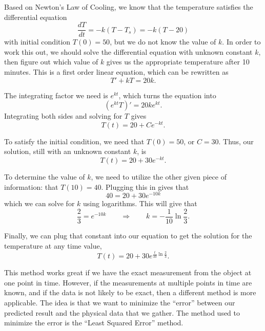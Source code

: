 \begin{exampleSol}
Based on Newton's Law of Cooling, we know that the temperature satisfies the differential equation
\begin{equation*}
\frac{dT}{dt} = -k(T - T_s) = -k(T - 20)
\end{equation*} 
with initial condition $T(0) = 50$, but we do not know the value of $k$. In order to work this out, we should solve the differential equation with unknown constant $k$, then figure out which value of $k$ gives us the appropriate temperature after 10 minutes. This is a first order linear equation, which can be rewritten as 
\begin{equation*}
T' + kT = 20k.
\end{equation*}

The integrating factor we need is $e^{kt}$, which turns the equation into
\begin{equation*}
(e^{kt}T)' = 20ke^{kt}.
\end{equation*}
Integrating both sides and solving for $T$ gives
\begin{equation*}
T(t) = 20 + Ce^{-kt}.
\end{equation*}

To satisfy the initial condition, we need that $T(0) = 50$, or $C = 30$. Thus, our solution, still with an unknown constant $k$, is
\begin{equation*}
T(t) = 20 + 30e^{-kt}.
\end{equation*}

To determine the value of $k$, we need to utilize the other given piece of information: that $T(10) = 40$. Plugging this in gives that
\begin{equation*}
40 = 20 + 30e^{-10k}
\end{equation*}
which we can solve for $k$ using logarithms. This will give that
\begin{equation*}
\frac{2}{3} = e^{-10k} \qquad \Rightarrow \qquad k = -\frac{1}{10} \ln{ \frac{2}{3}}.
\end{equation*}

Finally, we can plug that constant into our equation to get the solution for the temperature at any time value,
\begin{equation*}
T(t) = 20+30e^{\frac{t}{10}\ln{\frac{2}{3}}}. 
\end{equation*}
\end{exampleSol} 

This method works great if we have the exact measurement from the object at one point in time. However, if the measurements at multiple points in time are known, and if the data is not likely to be exact, then a different method is more applicable. The idea is that we want to minimize the ``error'' between our predicted result and the physical data that we gather. The method used to minimize the error is the ``Least Squared Error'' method.

